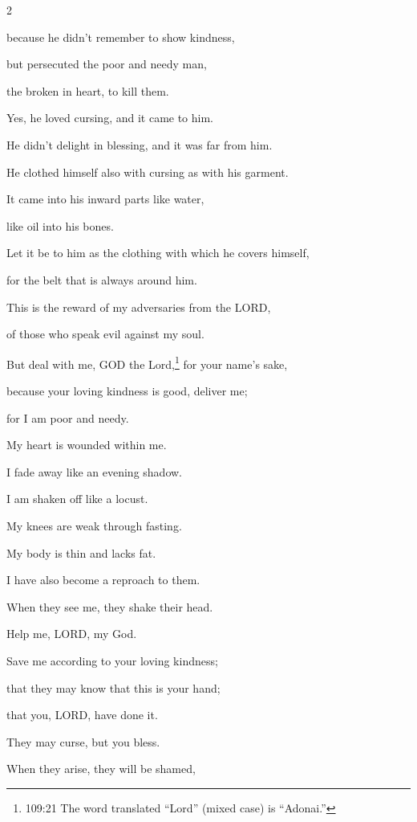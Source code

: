 \begin{multicols}{2}
	
	\myverse{}because he didn’t remember to show kindness,
	
	but persecuted the poor and needy man,
	
	the broken in heart, to kill them.
	
	
	\myverse{}Yes, he loved cursing, and it came to him.
	
	He didn’t delight in blessing, and it was far from him.
	
	
	\myverse{}He clothed himself also with cursing as with his garment.
	
	It came into his inward parts like water,
	
	like oil into his bones.
	
	
	\myverse{}Let it be to him as the clothing with which he covers himself,
	
	for the belt that is always around him.
	
	
	\myverse{}This is the reward of my adversaries from the LORD,
	
	of those who speak evil against my soul.
	
	\vspace{\baselineskip}
	
	\myverse{}But deal with me, GOD the Lord,\footnote{109:21 The word translated “Lord” (mixed case) is “Adonai.”} for your name’s sake,
	
	because your loving kindness is good, deliver me;
	
	
	\myverse{}for I am poor and needy.
	
	My heart is wounded within me.
	
	
	\myverse{}I fade away like an evening shadow.
	
	I am shaken off like a locust.
	
	
	\myverse{}My knees are weak through fasting.
	
	My body is thin and lacks fat.
	
	
	\myverse{}I have also become a reproach to them.
	
	When they see me, they shake their head.
	
	
	\myverse{}Help me, LORD, my God.
	
	Save me according to your loving kindness;
	
	
	\myverse{}that they may know that this is your hand;
	
	that you, LORD, have done it.
	
	
	\myverse{}They may curse, but you bless.
	
	When they arise, they will be shamed,
	

\end{multicols}
